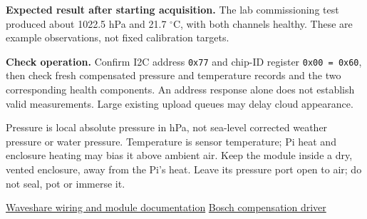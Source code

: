 \textbf{Expected result after starting acquisition.} The lab commissioning test produced about 1022.5 hPa and 21.7 $^\circ$C, with both channels healthy. These are example observations, not fixed calibration targets.

\textbf{Check operation.} Confirm I2C address \texttt{0x77} and chip-ID register \texttt{0x00 = 0x60}, then check fresh compensated pressure and temperature records and the two corresponding health components. An address response alone does not establish valid measurements. Large existing upload queues may delay cloud appearance.

Pressure is local absolute pressure in hPa, not sea-level corrected weather pressure or water pressure. Temperature is sensor temperature; Pi heat and enclosure heating may bias it above ambient air. Keep the module inside a dry, vented enclosure, away from the Pi's heat. Leave its pressure port open to air; do not seal, pot or immerse it.

\href{https://www.waveshare.com/wiki/BMP390_Barometric_Pressure_Sensor}{Waveshare wiring and module documentation}\quad
\href{https://github.com/boschsensortec/BMP3_SensorAPI}{Bosch compensation driver}
